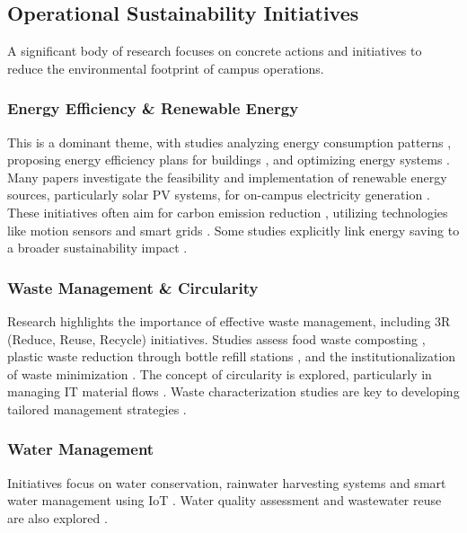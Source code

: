 \documentclass[12pt,a4paper]{article}
\begin{document}
\subsection{Operational Sustainability Initiatives}

A significant body of research focuses on concrete actions and initiatives to reduce the environmental footprint of campus operations.

\subsubsection{Energy Efficiency \& Renewable Energy}

This is a dominant theme, with studies analyzing energy consumption patterns \citep{Maistry2016}, proposing energy efficiency plans for buildings \citep{Soares2015, Pini2019, Ahmed2025, Laporte2025, Movlyanov2025}, and optimizing energy systems \citep{Amaral2020, Zhu2021}. Many papers investigate the feasibility and implementation of renewable energy sources, particularly solar PV systems, for on-campus electricity generation \citep{Muller2023, Diniz2024, Ayadi2025, Nayan2023}. These initiatives often aim for carbon emission reduction \citep{Odabasi2023, Mohamad2024}, utilizing technologies like motion sensors \citep{Riyanto2018} and smart grids \citep{Sharma2016}. Some studies explicitly link energy saving to a broader sustainability impact \citep{Zhu2021}.

\subsubsection{Waste Management \& Circularity}

Research highlights the importance of effective waste management, including 3R (Reduce, Reuse, Recycle) initiatives. Studies assess food waste composting \citep{AlAomar2022, Rupani2023}, plastic waste reduction through bottle refill stations \citep{Pujiati2024}, and the institutionalization of waste minimization \citep{Zen2016, Agustina2023}. The concept of circularity is explored, particularly in managing IT material flows \citep{Leclerc2022}. Waste characterization studies are key to developing tailored management strategies \citep{Hindiyeh2022, Devec2025}.

\subsubsection{Water Management}

Initiatives focus on water conservation, rainwater harvesting systems and smart water management using IoT \citep{Nadzri2024, Siddamal2022}. Water quality assessment and wastewater reuse are also explored \citep{Lopes2017, DeWata2025}.
\end{document}
